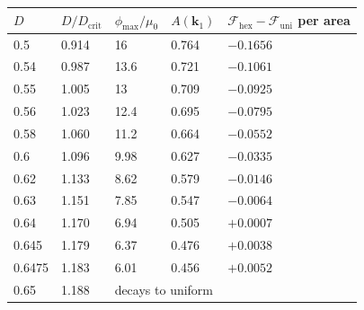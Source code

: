 \documentclass[11pt]{article}
\begin{document}
\begin{center}
\begin{tabular}{@{}lllll@{}}
\toprule
$D$ & $D/D_{\mathrm{crit}}$ & $\phi_{\max}/\mu_0$ & $A(\mathbf k_1)$ & $\mathcal F_{\mathrm{hex}}-\mathcal F_{\mathrm{uni}}$ per area \\
\midrule
0.5 & 0.914 & 16 & 0.764 & $-0.1656$ \\
0.54 & 0.987 & 13.6 & 0.721 & $-0.1061$ \\
0.55 & 1.005 & 13 & 0.709 & $-0.0925$ \\
0.56 & 1.023 & 12.4 & 0.695 & $-0.0795$ \\
0.58 & 1.060 & 11.2 & 0.664 & $-0.0552$ \\
0.6 & 1.096 & 9.98 & 0.627 & $-0.0335$ \\
0.62 & 1.133 & 8.62 & 0.579 & $-0.0146$ \\
0.63 & 1.151 & 7.85 & 0.547 & $-0.0064$ \\
0.64 & 1.170 & 6.94 & 0.505 & $+0.0007$ \\
0.645 & 1.179 & 6.37 & 0.476 & $+0.0038$ \\
0.6475 & 1.183 & 6.01 & 0.456 & $+0.0052$ \\
0.65 & 1.188 & \multicolumn{3}{l}{decays to uniform} \\
\bottomrule
\end{tabular}
\end{center}
\end{document}
